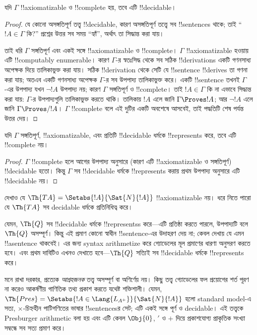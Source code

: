 \documentclass[../../../include/open-logic-section]{subfiles}
\begin{document}
\begin{thm}
যদি $\Gamma$ !!{axiomatizable} ও !!{complete} হয়, তবে এটি !!{decidable}।
\end{thm}

\begin{proof}
যে কোনো অসঙ্গতিপূর্ণ তত্ত্ব !!{decidable}, কারণ অসঙ্গতিপূর্ণ তত্ত্বে সব
!!{sentence}s থাকে; তাই ``$!A \in \Gamma$ কি?'' প্রশ্নের উত্তর সব সময়
``হ্যাঁ'', অর্থাৎ তা সিদ্ধান্ত করা যায়।

তাই ধরি $\Gamma$ সঙ্গতিপূর্ণ এবং একই সঙ্গে !!{axiomatizable} ও !!{complete}।
$\Gamma$ !!{axiomatizable} হওয়ায় এটি !!{computably enumerable}। কারণ
$\Gamma$-র স্বতঃসিদ্ধ থেকে সব সঠিক !!{derivation}s একটি গণনসাধ্য অপেক্ষক দিয়ে
তালিকাভুক্ত করা যায়। সঠিক !!{derivation} থেকে সেটি যে !!{sentence}
!!{derive}s তা গণনা করা যায়; অতএব একটি গণনসাধ্য অপেক্ষক $\Gamma$-র সব
উপপাদ্য তালিকাভুক্ত করে। একটি
!!{sentence} তখনই $\Gamma$-এর উপপাদ্য যখন $\lnot !A$ উপপাদ্য নয়; কারণ $\Gamma$ সঙ্গতিপূর্ণ
ও !!{complete}। তাই $!A \in \Gamma$
কি না এভাবে সিদ্ধান্ত করা যায়: $\Gamma$-র উপপাদ্যগুলি তালিকাভুক্ত করতে থাকি।
তালিকায় $!A$ এলে জানি $\Gamma \Proves !A$; আর $\lnot !A$ এলে জানি
$\Gamma \Proves/ !A$। $\Gamma$ !!{complete} বলে এই দুটির একটি অবশেষে আসবেই,
তাই পদ্ধতিটি শেষ পর্যন্ত উত্তর দেয়।
\end{proof}

\begin{cor}
যদি $\Gamma$ সঙ্গতিপূর্ণ, !!{axiomatizable}, এবং প্রতিটি !!{decidable} ধর্মকে
!!{represents} করে, তবে এটি !!{complete} নয়।
\end{cor}

\begin{proof}
$\Gamma$ !!{complete} হলে আগের উপপাদ্য অনুসারে (কারণ এটি !!{axiomatizable}
ও সঙ্গতিপূর্ণ) !!{decidable} হতো। কিন্তু $\Gamma$ সব !!{decidable} ধর্মকে
!!{represents} করায় প্রথম উপপাদ্য অনুসারে এটি !!{decidable} নয়।
\end{proof}

\begin{prob}
দেখাও যে $\Th{TA} = \Setabs{!A}{\Sat{N}{!A}}$ !!{axiomatizable} নয়। ধরে
নিতে পারো যে $\Th{TA}$ সব decidable ধর্মকে প্রতিনিধিত্ব করে।
\end{prob}

যেমন, $\Th{Q}$ সব !!{decidable} ধর্মকে !!{represents}s করে—এটি প্রতিষ্ঠা করতে
পারলে, উপপাদ্যটি বলে $\Th{Q}$ অসম্পূর্ণ। কিন্তু এই প্রমাণ কোনো স্বাধীন
!!{sentence}-এর উদাহরণ দেয় না; কেবল দেখায় যে এমন !!a{sentence} থাকবেই।
এর জন্য syntax arithmetize করে গ্যোডেলের মূল প্রমাণের ধারণা অনুসরণ করতে হবে।
এবং প্রথম দাবিটিও এখনও দেখাতে হবে—$\Th{Q}$ সত্যিই সব !!{decidable} ধর্মকে
!!{represents} করে।

মনে রাখা দরকার, প্রত্যেক \emph{আগ্রহজনক} তত্ত্ব অসম্পূর্ণ বা অণির্ণেয় নয়।
কিছু তত্ত্ব গ্যোডেলের ফল প্রয়োগের শর্ত পূরণ না করেও আকর্ষণীয় গাণিতিক তথ্য
প্রকাশ করতে যথেষ্ট শক্তিশালী। যেমন,
$\Th{Pres} = \Setabs{!A \in \Lang{L_{A^+}}}{\Sat{N}{!A}}$ হলো
standard model-এ সত্য, $\times$-চিহ্নহীন পাটিগণিতের ভাষার !!{sentence}sর সেট;
এটি একই সঙ্গে পূর্ণ ও decidable। এই তত্ত্বকে Presburger arithmetic বলা
হয় এবং এটি কেবল $\Obj{0}$, $\prime$ ও $+$ দিয়ে প্রকাশযোগ্য প্রাকৃতিক সংখ্যা
সম্বন্ধে সব সত্য প্রমাণ করে।
\end{document}
